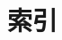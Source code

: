 \documentclass[11pt,a4paper,twoside,openright,scheme=chinese]{ctexbook}
\begin{document}
% 

\newpage
{}
\chapter*{索\qquad 引}
\begingroup  
\begin{multicols}{2} %
\printindex %
\end{multicols}  
\endgroup  
% 
\end{document}

